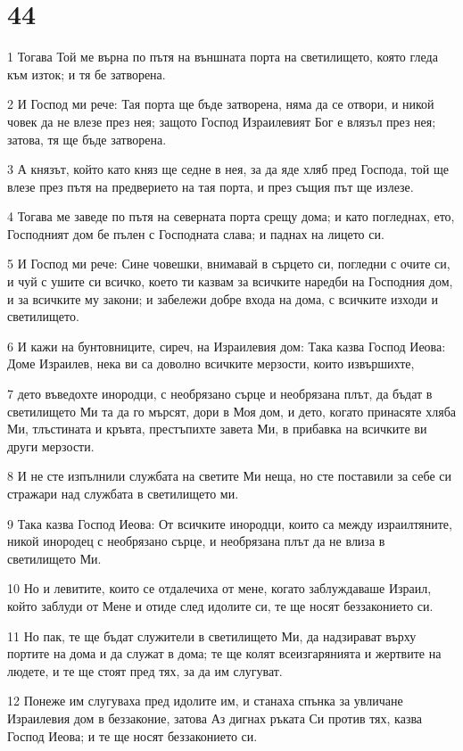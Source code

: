 \chapter{44}

\par 1 Тогава Той ме върна по пътя на външната порта на светилището, която гледа към изток; и тя бе затворена.
\par 2 И Господ ми рече: Тая порта ще бъде затворена, няма да се отвори, и никой човек да не влезе през нея; защото Господ Израилевият Бог е влязъл през нея; затова, тя ще бъде затворена.
\par 3 А князът, който като княз ще седне в нея, за да яде хляб пред Господа, той ще влезе през пътя на предверието на тая порта, и през същия път ще излезе.
\par 4 Тогава ме заведе по пътя на северната порта срещу дома; и като погледнах, ето, Господният дом бе пълен с Господната слава; и паднах на лицето си.
\par 5 И Господ ми рече: Сине човешки, внимавай в сърцето си, погледни с очите си, и чуй с ушите си всичко, което ти казвам за всичките наредби на Господния дом, и за всичките му закони; и забележи добре входа на дома, с всичките изходи и светилището.
\par 6 И кажи на бунтовниците, сиреч, на Израилевия дом: Така казва Господ Иеова: Доме Израилев, нека ви са доволно всичките мерзости, които извършихте,
\par 7 дето въведохте инородци, с необрязано сърце и необрязана плът, да бъдат в светилището Ми та да го мърсят, дори в Моя дом, и дето, когато принасяте хляба Ми, тлъстината и кръвта, престъпихте завета Ми, в прибавка на всичките ви други мерзости.
\par 8 И не сте изпълнили службата на светите Ми неща, но сте поставили за себе си стражари над службата в светилището ми.
\par 9 Така казва Господ Иеова: От всичките инородци, които са между израилтяните, никой инородец с необрязано сърце, и необрязана плът да не влиза в светилището Ми.
\par 10 Но и левитите, които се отдалечиха от мене, когато заблуждаваше Израил, който заблуди от Мене и отиде след идолите си, те ще носят беззаконието си.
\par 11 Но пак, те ще бъдат служители в светилището Ми, да надзирават върху портите на дома и да служат в дома; те ще колят всеизгарянията и жертвите на людете, и те ще стоят пред тях, за да им слугуват.
\par 12 Понеже им слугуваха пред идолите им, и станаха спънка за увличане Израилевия дом в беззаконие, затова Аз дигнах ръката Си против тях, казва Господ Иеова; и те ще носят беззаконието си.
